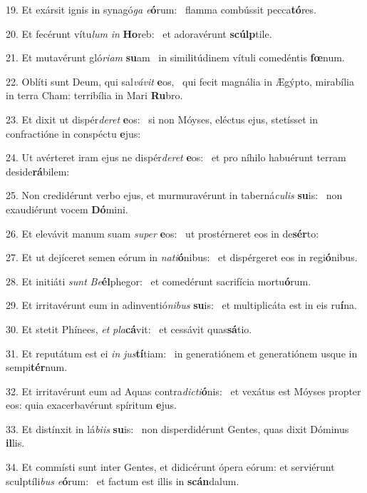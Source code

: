 19. Et exársit ignis in synagó\textit{ga} \textit{e}\textbf{ó}rum: \ast\  flamma combússit pecca\textbf{tó}res.\

20. Et fecérunt vítu\textit{lum} \textit{in} \textbf{Ho}reb: \ast\  et adoravérunt \textbf{scúlp}tile.\

21. Et mutavérunt gló\textit{ri}\textit{am} \textbf{su}am \ast\  in similitúdinem vítuli comedéntis \textbf{fœ}num.\

22. Oblíti sunt Deum, qui sal\textit{vá}\textit{vit} \textbf{e}os, \ast\  qui fecit magnália in Ægýpto, mirabília in terra Cham: terribília in Mari \textbf{Ru}bro.\

23. Et dixit ut dispér\textit{de}\textit{ret} \textbf{e}os: \ast\  si non Móyses, eléctus ejus, stetísset in confractióne in conspéctu \textbf{e}jus:\

24. Ut avérteret iram ejus ne dispér\textit{de}\textit{ret} \textbf{e}os: \ast\  et pro níhilo habuérunt terram deside\textbf{rá}bilem:\

25. Non credidérunt verbo ejus, et murmuravérunt in taberná\textit{cu}\textit{lis} \textbf{su}is: \ast\  non exaudiérunt vocem \textbf{Dó}mini.\

26. Et elevávit manum suam \textit{su}\textit{per} \textbf{e}os: \ast\  ut prostérneret eos in de\textbf{sér}to:\

27. Et ut dejíceret semen eórum in \textit{na}\textit{ti}\textbf{ó}nibus: \ast\  et dispérgeret eos in regi\textbf{ó}nibus.\

28. Et initiáti \textit{sunt} \textit{Be}\textbf{él}phegor: \ast\  et comedérunt sacrifícia mortu\textbf{ó}rum.\

29. Et irritavérunt eum in adinventió\textit{ni}\textit{bus} \textbf{su}is: \ast\  et multiplicáta est in eis ru\textbf{í}na.\

30. Et stetit Phínees, \textit{et} \textit{pla}\textbf{cá}vit: \ast\  et cessávit quas\textbf{sá}tio.\

31. Et reputátum est ei \textit{in} \textit{jus}\textbf{tí}tiam: \ast\  in generatiónem et generatiónem usque in sempi\textbf{tér}num.\

32. Et irritavérunt eum ad Aquas contra\textit{dic}\textit{ti}\textbf{ó}nis: \ast\  et vexátus est Móyses propter eos: quia exacerbavérunt spíritum \textbf{e}jus.\

33. Et distínxit in lá\textit{bi}\textit{is} \textbf{su}is: \ast\  non disperdidérunt Gentes, quas dixit Dóminus \textbf{il}lis.\

34. Et commísti sunt inter Gentes, et didicérunt ópera eórum: et serviérunt sculptíli\textit{bus} \textit{e}\textbf{ó}rum: \ast\  et factum est illis in \textbf{scán}dalum.\

